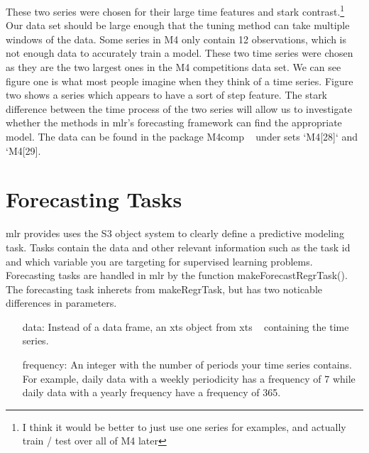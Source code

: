 \documentclass{article}\usepackage[]{graphicx}\usepackage[]{color}
\makeatletter
\theoremstyle{definition}
\newcommand\code{\@codex}
\def\@codex#1{{\normalfont\ttfamily\hyphenchar\font=-1 #1}}
\newcommand{\pkg}[1]{{\fontseries{b}\selectfont #1}}
\makeatother
\begin{document}
These two series were chosen for their large time features and stark contrast.\footnote{I think it would be better to just use one series for examples, and actually train / test over all of M4 later} Our data set should be large enough that the tuning method can take multiple windows of the data. Some series in M4 only contain 12 observations, which is not enough data to accurately train a model. These two time series were chosen as they are the two largest ones in the M4 competitions data set. We can see figure one is what most people imagine when they think of a time series. Figure two shows a series which appears to have a sort of step feature. The stark difference between the time process of the two series will allow us to investigate whether the methods in \pkg{mlr}'s forecasting framework can find the appropriate model. The data can be found in the package \pkg{M4comp} ~\cite{m4comp} under sets `M4[28]` and `M4[29]. 

\section{Forecasting Tasks}
\label{sec:task}

\pkg{mlr} provides uses the S3 object system to clearly define a predictive modeling task. Tasks contain the data and other relevant information such as the task id and which variable you are targeting for supervised learning problems. Forecasting tasks are handled in \pkg{mlr} by the function \code{makeForecastRegrTask()}. The forecasting task inherets from \code{makeRegrTask}, but has two noticable differences in parameters.

\begin{itemize}
\item[data:] Instead of a data frame, an xts object from \pkg{xts} ~\cite{xts} containing the time series.
\item[frequency:] An integer with the number of periods your time series contains. For example, daily data with a weekly periodicity has a frequency of 7 while daily data with a yearly frequency have a frequency of 365.
\end{itemize}
\end{document}
